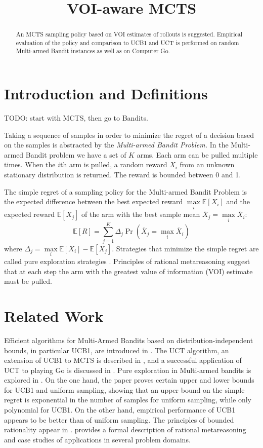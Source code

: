 \documentclass{ecai2012}
\title{VOI-aware MCTS}
\newcommand {\IE} {\ensuremath {\mathbb{E}}}
\begin{document}
\maketitle

\begin{abstract}
An MCTS sampling policy based on VOI estimates of rollouts is
suggested. Empirical evaluation of the policy and comparison to
UCB1 and UCT is performed on random Multi-armed Bandit instances
as well as on Computer Go.
\end{abstract}

\section{Introduction and Definitions}

TODO: start with MCTS, then go to Bandits.

Taking a sequence of samples in order to minimize the
regret of a decision based on the samples is abstracted by the
{\em Multi-armed Bandit Problem.} In the Multi-armed Bandit problem
we have a set of $K$ arms. Each arm can be pulled multiple
times. When the $i$th arm is pulled, a random reward $X_i$ from an
unknown stationary distribution is returned.  The reward is bounded
between 0 and 1.

The simple regret of a sampling policy for the Multi-armed Bandit
Problem is the expected difference between the best expected reward
$\max\limits_i\IE[X_i]$ and the expected reward $\IE[X_j]$ of the arm
with the best sample mean $\overline X_j=\max\limits_i\overline X_i$:
\begin{equation}
\label{eqn:simple-regret}
\IE[R]=\sum_{j=1}^K\Delta_j\Pr(\overline X_j=\max_i\overline X_i)
\end{equation}
where $\Delta_j=\max\limits_i\IE[X_i]-\IE[X_j]$.  Strategies that
minimize the simple regret are called pure exploration strategies
\cite{Bubeck.pure}. Principles of rational metareasoning
\cite{Russell.right} suggest that at each step the arm with the
greatest value of information (VOI) estimate must be pulled.

\section{Related Work}

Efficient algorithms for Multi-Armed Bandits based on
distribution-independent bounds, in particular UCB1, are introduced in
\cite{Auer.ucb}. The UCT algorithm, an extension of UCB1 to
MCTS is described in \cite{Kocsis.uct}, and a successful
application of UCT to playing Go is discussed in
\cite{Gelly.mogo}. Pure exploration in Multi-armed bandits is explored in
\cite{Bubeck.pure}. On the one hand, the paper proves certain upper
and lower bounds for UCB1 and uniform sampling, showing that an upper
bound on the simple regret is exponential in the number of samples for
uniform sampling, while only polynomial for UCB1. On the other hand,
empirical performance of UCB1 appears to be better than of uniform
sampling. The principles of bounded rationality appear in
\cite{Horvitz.reasoningabout}. \cite{Russell.right} provides a formal
description of rational metareasoning and case studies of applications
in several problem domains. 
\end{document}
